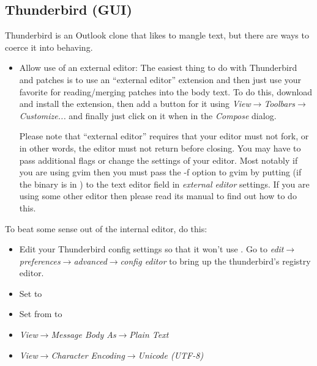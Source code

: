 \documentclass[a4paper,8pt,english]{sphinxmanual}
\begin{document}
\subsection{Thunderbird (GUI)}
\label{process/email-clients:thunderbird-gui}
Thunderbird is an Outlook clone that likes to mangle text, but there are ways
to coerce it into behaving.
\begin{itemize}
\item {} 
Allow use of an external editor:
The easiest thing to do with Thunderbird and patches is to use an
``external editor'' extension and then just use your favorite 
for reading/merging patches into the body text.  To do this, download
and install the extension, then add a button for it using
\emph{View\(\rightarrow\)Toolbars\(\rightarrow\)Customize...} and finally just click on it
when in the \emph{Compose} dialog.

Please note that ``external editor'' requires that your editor must not
fork, or in other words, the editor must not return before closing.
You may have to pass additional flags or change the settings of your
editor. Most notably if you are using gvim then you must pass the -f
option to gvim by putting  (if the binary is in
) to the text editor field in \emph{external editor}
settings. If you are using some other editor then please read its manual
to find out how to do this.

\end{itemize}

To beat some sense out of the internal editor, do this:
\begin{itemize}
\item {} 
Edit your Thunderbird config settings so that it won't use .
Go to \emph{edit\(\rightarrow\)preferences\(\rightarrow\)advanced\(\rightarrow\)config editor} to bring up
the thunderbird's registry editor.

\item {} 
Set  to 

\item {} 
Set  from  to 

\item {} 
\emph{View\(\rightarrow\)Message Body As\(\rightarrow\)Plain Text}

\item {} 
\emph{View\(\rightarrow\)Character Encoding\(\rightarrow\)Unicode (UTF-8)}

\end{itemize}
\end{document}
